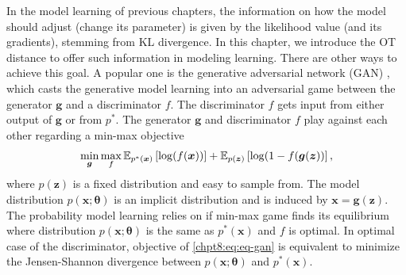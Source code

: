 \begin{remark}
  In the model learning of previous chapters, the information on how the model should adjust (change its parameter) is given by the likelihood value (and its gradients), stemming from KL divergence. In this chapter, we introduce the OT distance to offer such information in modeling learning. There are other ways to achieve this goal. A popular one is the generative adversarial network (GAN) \cite{goodfellow2014gan, 2017arXiv170100160G}, which casts the generative model learning into an adversarial game between the generator $\bm{g}$ and a discriminator $f$.
The {discriminator} $f$ gets input from either output of $\bm{g}$ or from
$p^{\ast}$. The generator $\bm{g}$ and discriminator ${f}$ play against each other
regarding a min-max objective
\begin{equation}\label{chpt8:eq:eq-gan}
  \min_{\bm{g}} \max_f \mathbb{E}_{p^{\ast}(\bm{x})}\left[ \log(f(\bm{x})) \right] + \mathbb{E}_{p(\bm{z})}\left[ \log(1-f(\bm{g}(\bm{z})) \right],
\end{equation}
where $p(\bm{z})$ is a fixed distribution and easy to sample from. The model distribution $p(\bm{x}; \bm{\theta})$ is an implicit distribution and is induced by $\bm{x} = \bm{g}(\bm{z})$.
The probability model learning relies on if min-max game finds
its equilibrium where distribution $p(\bm{x}; \bm{\theta})$ is the same as $p^{\ast}(\bm{x})$ and
$f$ is optimal. In optimal case of the discriminator, objective of
\eqref{chpt8:eq:eq-gan} is equivalent to minimize the Jensen-Shannon divergence between $p(\bm{x}; \bm{\theta})$ and $p^{\ast}(\bm{x})$.
\end{remark}



